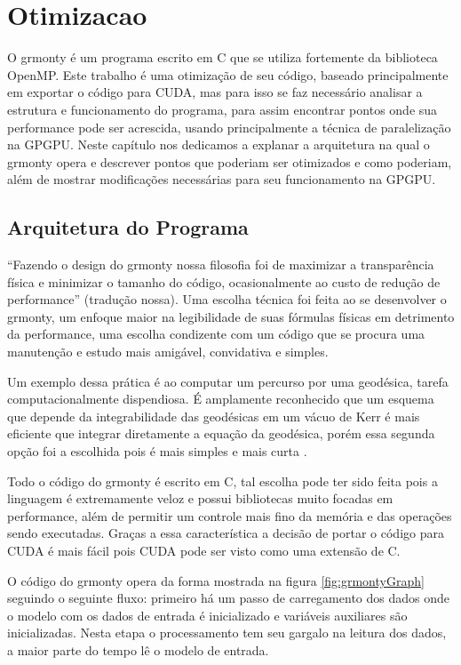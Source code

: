 \chapter{Otimizacao}
\label{cap:otimizacao}
  O grmonty é um programa escrito em C que se utiliza fortemente da biblioteca OpenMP.
  Este trabalho é uma otimização de seu código, baseado principalmente em exportar
  o código para CUDA, mas para isso se faz necessário analisar a estrutura e
  funcionamento do programa, para assim encontrar pontos onde sua performance
  pode ser acrescida, usando principalmente a técnica de paralelização na GPGPU.
  Neste capítulo nos dedicamos a explanar a arquitetura na qual o grmonty opera
  e descrever pontos que poderiam ser otimizados e como poderiam, além de mostrar
  modificações necessárias para seu funcionamento na GPGPU.

\section{Arquitetura do Programa}
  ``Fazendo o design do grmonty nossa filosofia foi de maximizar a transparência
  física e minimizar o tamanho do código, ocasionalmente ao custo de redução de
  performance'' \citep{Dolence:09} (tradução nossa). Uma escolha técnica foi feita
  ao se desenvolver o grmonty, um enfoque maior na legibilidade de suas fórmulas
  físicas em detrimento da performance, uma escolha condizente com um
  código que se procura uma manutenção e estudo mais amigável, convidativa e simples.

  Um exemplo dessa prática é ao computar um percurso por uma geodésica, tarefa
  computacionalmente dispendiosa. É amplamente reconhecido \citep{ynogkm:13} que
  um esquema que depende da integrabilidade das geodésicas em um vácuo de Kerr é
  mais eficiente que integrar diretamente a equação da geodésica, porém essa segunda
  opção foi a escolhida pois é mais simples e mais curta \citep{Dolence:09}.

  Todo o código do grmonty é escrito em C, tal escolha pode ter sido feita pois
  a linguagem é extremamente veloz e possui bibliotecas muito focadas em performance, além de permitir um controle mais fino da memória e das
  operações sendo executadas. Graças a essa característica a decisão de portar o
  código para CUDA é mais fácil pois CUDA pode ser visto como uma extensão de C.

  O código do grmonty opera da forma mostrada na figura \ref{fig:grmontyGraph} seguindo o seguinte fluxo: primeiro há um passo de carregamento dos dados onde o modelo com os dados de entrada é inicializado e variáveis auxiliares são inicializadas. Nesta etapa o processamento tem seu gargalo na leitura dos dados, a maior parte do tempo lê o modelo de entrada.

